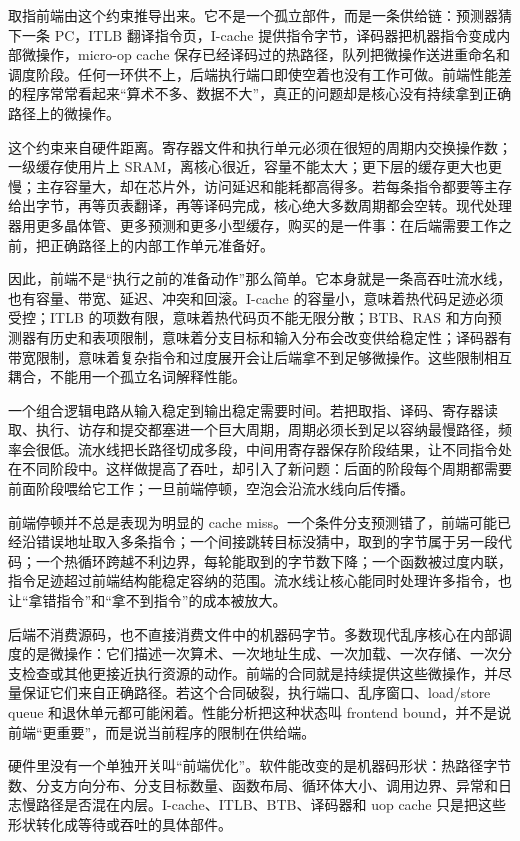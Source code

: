 取指前端由这个约束推导出来。它不是一个孤立部件，而是一条供给链：预测器猜下一条 PC，ITLB 翻译指令页，I-cache 提供指令字节，译码器把机器指令变成内部微操作，micro-op cache 保存已经译码过的热路径，队列把微操作送进重命名和调度阶段。任何一环供不上，后端执行端口即使空着也没有工作可做。前端性能差的程序常常看起来“算术不多、数据不大”，真正的问题却是核心没有持续拿到正确路径上的微操作。

这个约束来自硬件距离。寄存器文件和执行单元必须在很短的周期内交换操作数；一级缓存使用片上 SRAM，离核心很近，容量不能太大；更下层的缓存更大也更慢；主存容量大，却在芯片外，访问延迟和能耗都高得多。若每条指令都要等主存给出字节，再等页表翻译，再等译码完成，核心绝大多数周期都会空转。现代处理器用更多晶体管、更多预测和更多小型缓存，购买的是一件事：在后端需要工作之前，把正确路径上的内部工作单元准备好。

因此，前端不是“执行之前的准备动作”那么简单。它本身就是一条高吞吐流水线，也有容量、带宽、延迟、冲突和回滚。I-cache 的容量小，意味着热代码足迹必须受控；ITLB 的项数有限，意味着热代码页不能无限分散；BTB、RAS 和方向预测器有历史和表项限制，意味着分支目标和输入分布会改变供给稳定性；译码器有带宽限制，意味着复杂指令和过度展开会让后端拿不到足够微操作。这些限制相互耦合，不能用一个孤立名词解释性能。

一个组合逻辑电路从输入稳定到输出稳定需要时间。若把取指、译码、寄存器读取、执行、访存和提交都塞进一个巨大周期，周期必须长到足以容纳最慢路径，频率会很低。流水线把长路径切成多段，中间用寄存器保存阶段结果，让不同指令处在不同阶段中。这样做提高了吞吐，却引入了新问题：后面的阶段每个周期都需要前面阶段喂给它工作；一旦前端停顿，空泡会沿流水线向后传播。

前端停顿并不总是表现为明显的 cache miss。一个条件分支预测错了，前端可能已经沿错误地址取入多条指令；一个间接跳转目标没猜中，取到的字节属于另一段代码；一个热循环跨越不利边界，每轮能取到的字节数下降；一个函数被过度内联，指令足迹超过前端结构能稳定容纳的范围。流水线让核心能同时处理许多指令，也让“拿错指令”和“拿不到指令”的成本被放大。

后端不消费源码，也不直接消费文件中的机器码字节。多数现代乱序核心在内部调度的是微操作：它们描述一次算术、一次地址生成、一次加载、一次存储、一次分支检查或其他更接近执行资源的动作。前端的合同就是持续提供这些微操作，并尽量保证它们来自正确路径。若这个合同破裂，执行端口、乱序窗口、load/store queue 和退休单元都可能闲着。性能分析把这种状态叫 frontend bound，并不是说前端“更重要”，而是说当前程序的限制在供给端。

\begin{deepdive}
硬件里没有一个单独开关叫“前端优化”。软件能改变的是机器码形状：热路径字节数、分支方向分布、分支目标数量、函数布局、循环体大小、调用边界、异常和日志慢路径是否混在内层。I-cache、ITLB、BTB、译码器和 uop cache 只是把这些形状转化成等待或吞吐的具体部件。
\end{deepdive}

